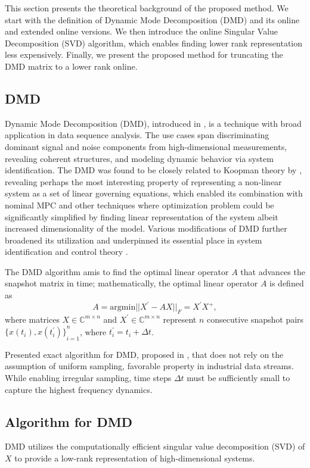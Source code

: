This section presents the theoretical background of the proposed method. We start with the definition of Dynamic Mode Decomposition (DMD) and its online and extended online versions. We then introduce the online Singular Value Decomposition (SVD) algorithm, which enables finding lower rank representation less expensively. Finally, we present the proposed method for truncating the DMD matrix to a lower rank online.

\subsection{DMD}\label{sec:dmd}
Dynamic Mode Decomposition (DMD), introduced in \citet{Schmid2010}, is a technique with broad application in data sequence analysis. The use cases span discriminating dominant signal and noise components from high-dimensional measurements, revealing coherent structures, and modeling dynamic behavior via system identification. The DMD was found to be closely related to Koopman theory by \citet{Rowley2009}, revealing perhaps the most interesting property of representing a non-linear system as a set of linear governing equations, which enabled its combination with nominal MPC and other techniques where optimization problem could be significantly simplified by finding linear representation of the system albeit increased dimensionality of the model. Various modifications of DMD further broadened its utilization and underpinned its essential place in system identification and control theory \citep{Schmid2022}.

The DMD algorithm amis to find the optimal linear operator \(A\) that advances the snapshot matrix in time; mathematically, the optimal linear operator \(A\) is defined as
\begin{equation}\label{eq:best-fit-operator}
	A = \mathrm{argmin} ||X^\prime - AX||_F = X^\prime X^+,
\end{equation}
where matrices \(X \in \mathbb{C}^{m \times n}\) and \(X^\prime \in \mathbb{C}^{m \times n}\) represent \(n\) consecutive snapshot pairs \({\{x(t_i), x(t_i^\prime )\}}^n_{i=1}\), where \(t_i^\prime = t_i + \Delta t\).

Presented exact algorithm for DMD, proposed in \citet{Tu2013}, that does not rely on the assumption of uniform sampling, favorable property in industrial data streams. While enabling irregular sampling, time steps \(\Delta t\) must be sufficiently small to capture the highest frequency dynamics.

\subsection{Algorithm for DMD}
DMD utilizes the computationally efficient singular value decomposition (SVD) of \(X\) to provide a low-rank representation of high-dimensional systems.

